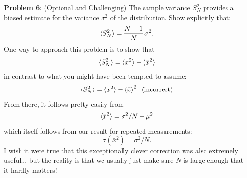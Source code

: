 \documentclass[12pt,oneside]{book}
\begin{document}
\vskip 1cm
\noindent
{\bf Problem 6:} (Optional and Challenging)  The sample variance $S_N^2$ provides a biased estimate for the variance $\sigma^2$ of the distribution.  Show explicitly that:
\begin{displaymath}
  \braket{S_N^2} = \frac{N-1}{N}\,\sigma^2.
\end{displaymath}
One way to approach this problem is to show that
\begin{displaymath}
  \braket{S_N^2} = \braket{x^2} - \braket{\bar{x}^2}
\end{displaymath}
in contrast to what you might have been tempted to assume:
\begin{displaymath}
  \braket{S_N^2} = \braket{x^2} - \braket{\bar{x}}^2 \;\;\rm (incorrect)
\end{displaymath} 
From there, it follows pretty easily from
\begin{displaymath}
  \braket{\bar{x}^2} = \sigma^2/N + \mu^2
\end{displaymath}
which itself follows from our result for repeated measurements:
\begin{displaymath}
  \sigma(\bar{x}^2) = \sigma^2/N.
\end{displaymath}
I wish it were true that this exceptionally clever correction was also
extremely useful... but the reality is that we usually just make sure
$N$ is large enough that it hardly matters! 

\end{document}
